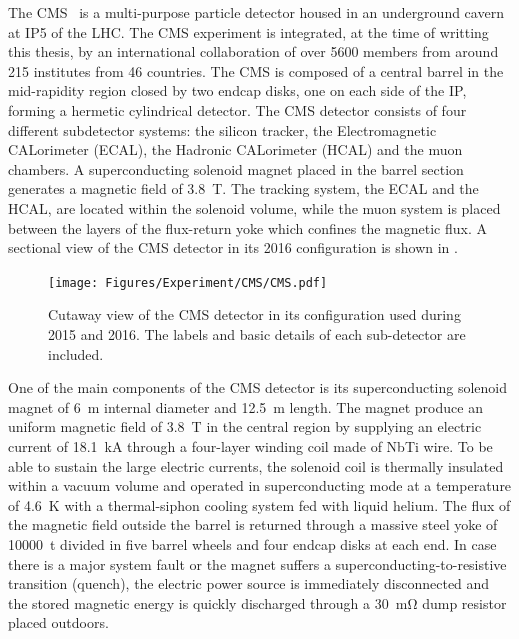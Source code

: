 The CMS~\cite{CMS} is a multi-purpose particle detector housed in an underground cavern at IP5 of the LHC. The CMS experiment is integrated, at the time of writting this thesis, by an international collaboration of over 5600 members from around 215 institutes from 46 countries. The CMS is composed of a central barrel in the mid-rapidity region closed by two endcap disks, one on each side of the IP, forming a hermetic cylindrical detector. The CMS detector consists of four different subdetector systems: the silicon tracker, the Electromagnetic CALorimeter (ECAL), the Hadronic CALorimeter (HCAL) and the muon chambers. A superconducting solenoid magnet placed in the barrel section generates a magnetic field of \SI{3.8}{\tesla}. The tracking system, the ECAL and the HCAL, are located within the solenoid volume, while the muon system is placed between the layers of the flux-return yoke which confines the magnetic flux.  A sectional view of the CMS detector in its 2016 configuration is shown in .

\begin{figure}[!htbp]
 \begin{center}
  \texttt{[image: Figures/Experiment/CMS/CMS.pdf]}
 \end{center}
 \caption{Cutaway view of the CMS detector in its configuration used during 2015 and 2016. The labels and basic details of each sub-detector are included.~\cite{CMSLayout} }
 \label{fig:CMS2016}
\end{figure}

One of the main components of the CMS detector is its superconducting solenoid magnet of \SI{6}{\m} internal diameter and \SI{12.5}{\m} length. The magnet produce an uniform magnetic field of \SI{3.8}{\tesla} in the central region by supplying an electric current of \SI{18.1}{\kA} through a four-layer winding coil made of NbTi wire. To be able to sustain the large electric currents, the solenoid coil is thermally insulated within a vacuum volume and operated in superconducting mode at a temperature of \SI{4.6}{\K} with a thermal-siphon cooling system fed with liquid helium. The flux of the magnetic field outside the barrel is returned through a massive steel yoke of \SI{10000}{\tonne} divided in five barrel wheels and four endcap disks at each end. In case there is a major system fault or the magnet suffers a superconducting-to-resistive transition (quench), the electric power source is immediately disconnected and the stored magnetic energy is quickly discharged through a \SI{30}{\mohm} dump resistor placed outdoors.

